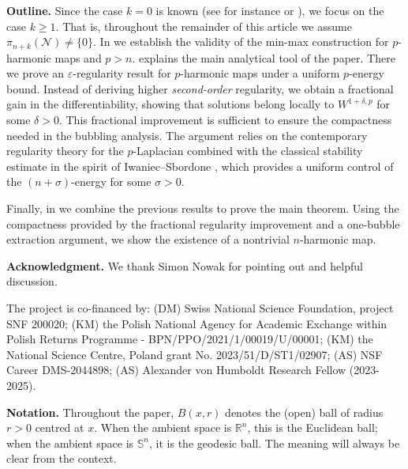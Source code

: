 \documentclass[12pt]{amsart}
\def\eps{\varepsilon}
\def\S{{\mathbb S}}
\newcommand{\R}{\mathbb{R}}
\numberwithin{theorem}{section} \numberwithin{equation}{section}
\newcommand{\mfdN}{\mathcal{N}}
\newlength{\temp}
\begin{document}
{\bf Outline.} Since the case $k=0$ is known (see for instance \cite{W1986,W1988} or \cite[Theorem 0]{Kawai-Nakauchi-Takeuchi}), we focus on the case $k \geq 1$. That is, throughout the remainder of this article we assume $\pi_{n+k}(\mfdN)\neq \{0\}$. In  we establish the validity of the min-max construction for $p$-harmonic maps and $p > n$.  explains the main analytical tool of the paper. There we prove an $\eps$-regularity result for $p$-harmonic maps under a uniform $p$-energy bound. Instead of deriving higher \emph{second-order} regularity, we obtain a fractional gain in the differentiability, showing that solutions belong locally to $W^{1+\delta, p}$ for some $\delta>0$. This fractional improvement is sufficient to ensure the compactness needed in the bubbling analysis. The argument relies on the contemporary regularity theory for the $p$-Laplacian combined with the classical stability estimate in the spirit of Iwaniec--Sbordone \cite{Iwaniec-Sbordone}, which provides a uniform control of the $(n+\sigma)$-energy for some $\sigma>0$.

Finally, in  we combine the previous results to prove the main theorem. Using the compactness provided by the fractional regularity improvement and a one-bubble extraction argument, we show the existence of a nontrivial $n$-harmonic map.

{\bf Acknowledgment.} We thank Simon Nowak for pointing out \cite{BDW20} and helpful discussion.

The project is co-financed by: (DM) Swiss National Science Foundation, project SNF 200020; (KM) the Polish National Agency for Academic Exchange within Polish Returns Programme - BPN/PPO/2021/1/00019/U/00001;
(KM) the National Science Centre, Poland grant No. 2023/51/D/ST1/02907;
 (AS) NSF Career DMS-2044898;
(AS) Alexander von Humboldt Research Fellow (2023-2025).


 {\bf Notation.} Throughout the paper, $B(x,r)$ denotes the (open) ball of radius $r>0$ centred at $x$. When the ambient space is $\R^n$, this is the Euclidean ball; when the ambient space is $\S^n$, it is the geodesic ball. The meaning will always be clear from the context.
\end{document}
